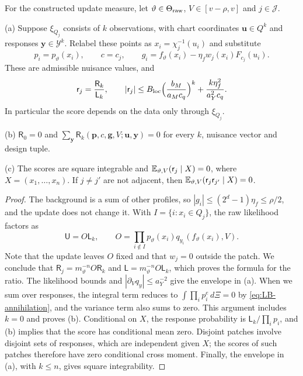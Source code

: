 \begin{lemma}\label{lem:score}
For the constructed update measure, let $\vartheta\in\Theta_{\rm raw}$, $V\in[v-\rho,v]$ and
$j\in\mathcal J$.

\textup{(a)} Suppose $\xi_{Q_j}$ consists of $k$ observations, with chart
coordinates $\mathbf u\in Q^k$ and responses $\mathbf y\in\mathcal Y^k$.
Relabel these points as $x_i=\chi_j^{-1}(u_i)$ and substitute
\begin{equation}\label{eq:LB-background}
 p_i=p_\vartheta(x_i),\qquad c=c_j,\qquad
 g_i=f_\vartheta(x_i)-\eta_fw_j(x_i)F_{c_j}(u_i).
\end{equation}
These are admissible nuisance values, and
\begin{equation}\label{eq:LB-chart-score}
 \mathsf r_j=\frac{\mathsf R_k}{\mathsf L_k},\qquad
 |\mathsf r_j|\le B_{\rm loc}\Bigl(\frac{b_M}{a_Mc_q}\Bigr)^k
 +\frac{k\eta_f^2}{a_Y^2c_q}.
\end{equation}
In particular the score depends on the data only through $\xi_{Q_j}$.

\textup{(b)} $\mathsf R_0=0$ and
$\sum_{\mathbf y}\mathsf R_k(\mathbf p,c,\mathbf g,V;\mathbf u,\mathbf y)=0$
for every $k$, nuisance vector and design tuple.

\textup{(c)} The scores are square integrable and
$\mathbb E_{\vartheta,V}(\mathsf r_j\mid X)=0$, where
$X=(x_1,\ldots,x_n)$. If $j\ne j'$ are not adjacent, then
$\mathbb E_{\vartheta,V}(\mathsf r_j\mathsf r_{j'}\mid X)=0$.
\end{lemma}

\begin{proof}
The background is a sum of other profiles, so
$|g_i|\le(2^d-1)\eta_f\le\rho/2$, and the update does not change it.
With $I=\{i:x_i\in Q_j\}$, the raw likelihood factors as
\begin{equation}\label{eq:LB-lik-split}
 \mathsf U=O\mathsf L_k,\qquad
 O=\prod_{i\notin I}p_\vartheta(x_i)q_{y_i}(f_\vartheta(x_i),V).
\end{equation}
Note that the update leaves $O$ fixed and that $w_j=0$ outside the
patch. We conclude
that $\mathsf R_j=m_\vartheta^{-n}O\mathsf R_k$ and
$\mathsf L=m_\vartheta^{-n}O\mathsf L_k$, which proves the formula for
the ratio. The likelihood bounds and $|\partial_Vq_y|\le a_Y^{-2}$ give
the envelope in (a).
When we sum over responses, the integral term reduces to
$\int\prod_i p_i^e\,d\Xi=0$ by \eqref{eq:LB-annihilation}, and the
variance term also sums to zero. This argument includes $k=0$ and
proves (b). Conditional on $X$, the response probability is
$\mathsf L_k/\prod_i p_i$, and (b) implies that the score has conditional
mean zero. Disjoint patches involve disjoint sets of responses, which
are independent given $X$; the scores of such patches therefore have
zero conditional cross moment. Finally, the envelope in (a), with
$k\le n$, gives square integrability.
\end{proof}

